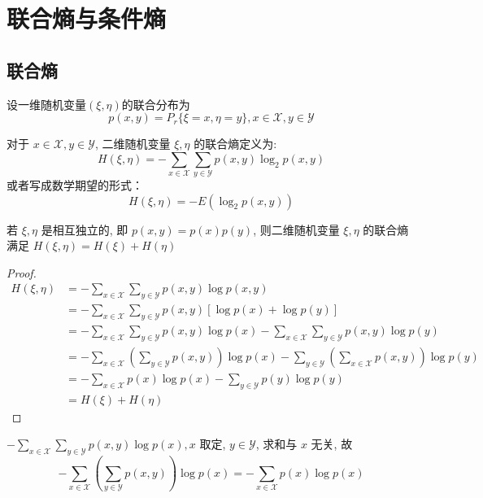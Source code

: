 \section{联合熵与条件熵}
\subsection{联合熵}
\begin{definition}
设一维随机变量$(\xi, \eta )$的联合分布为$$p(x,y)=P_r\{\xi=x, \eta=y\}, x \in \mathscr{X}, y \in \mathscr{Y} $$

    对于 $ x \in \mathscr{X}, y \in \mathscr{Y} $, 二维随机变量 $ \xi, \eta $ 的联合熵定义为:
$$
H(\xi, \eta)=-\sum_{x \in \mathscr{X}} \sum_{y \in \mathscr{Y}} p(x, y) \log _{2} p(x, y)
$$
或者写成数学期望的形式：
$$H(\xi, \eta)=-E \left( \log_2 p(x,y)\right)$$
\end{definition}

\begin{remark}
    若 $ \xi, \eta $ 是相互独立的, 即 $ p(x, y)=p(x) p(y) $, 则二维随机变量 $ \xi, \eta $ 的联合熵满足 $ H(\xi, \eta)=H(\xi)+H(\eta) $
\end{remark}
\begin{proof}

$$
\begin{aligned}
 H(\xi, \eta)&=-\sum_{x \in \mathscr{X}} \sum_{y \in \mathscr{Y}} p(x, y) \log p(x, y) \\
&=-\sum_{x \in \mathscr{X}} \sum_{y \in \mathscr{Y}} p(x, y)[\log p(x)+\log p(y)] \\
&=-\sum_{x \in \mathscr{X}} \sum_{y \in \mathscr{Y}} p(x, y) \log p(x)-\sum_{x \in \mathscr{X}} \sum_{y \in \mathscr{Y}} p(x, y) \log p(y) \\
&=-\sum_{x \in \mathscr{X}}\left(\sum_{y \in \mathscr{Y}} p(x, y)\right) \log p(x)-\sum_{y \in \mathscr{Y}}\left(\sum_{x \in \mathscr{X}} p(x, y)\right) \log p(y) \\
&=-\sum_{x \in \mathscr{X}} p(x) \log p(x)-\sum_{y \in \mathscr{Y}} p(y) \log p(y) \\
&=H(\xi)+H(\eta)
\end{aligned}
$$
\end{proof}
\begin{remark}
     $ -\sum\limits_{x \in \mathscr{X}} \sum\limits_{y \in \mathscr{Y}} p(x, y) \log p(x), x $ 取定, $ y \in \mathscr{Y} $, 求和与 $ x $ 无关, 故 $$-\sum_{x \in \mathscr{X}}\left(\sum_{y \in \mathscr{Y}} p(x, y)\right) \log p(x)=-\sum_{x \in \mathscr{X}} p(x) \log p(x) $$
\end{remark}


